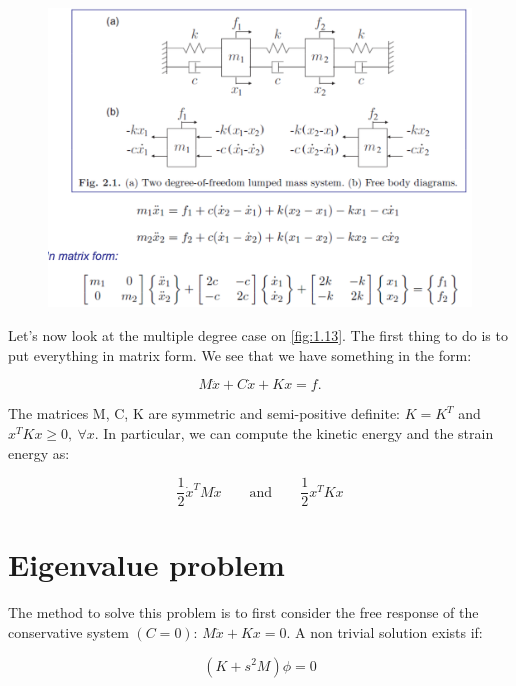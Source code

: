  			\begin{figure}
			\vspace{-5mm}
			\includegraphics[scale=0.3]{vibration/ch1/13}
			\label{fig:1.13}
			\end{figure}
			Let's now look at the multiple degree case on \autoref{fig:1.13}. The first thing to do is to put everything in matrix form. We see that we have something in the form:
			
			\begin{equation}
				M\ddot x + C \dot{x} + Kx = f.
\end{equation}			 

			The matrices M, C, K are symmetric and semi-positive definite: $K = K^T$ and $x^TKx\geq 0, \ \forall x$. In particular, we can compute the kinetic energy and the strain energy as:
			
			\begin{equation}
			\frac{1}{2}\dot{x}^TM\dot{x} \qquad \mbox{and} \qquad \frac{1}{2} {x}^TK{x}
			\end{equation}
			
		\section{Eigenvalue problem}
			The method to solve this problem is to first consider the free response of the conservative system $(C=0)$: $M\ddot{x} + Kx = 0$. A non trivial solution exists if: 
			
			\begin{equation}
				(K+s^2M)\phi = 0
			\end{equation}
			
